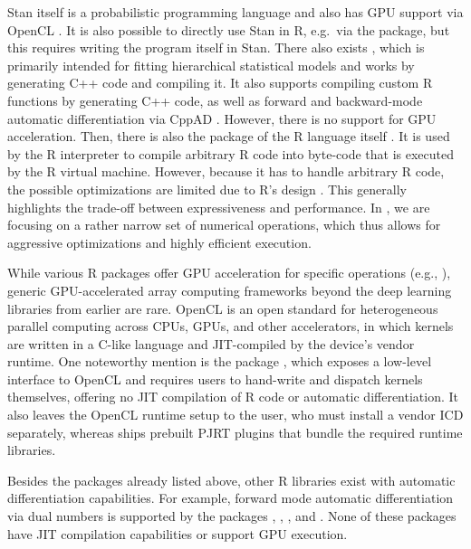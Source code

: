 Stan itself is a probabilistic programming language and also has GPU support via OpenCL \citep{ref-opencl}.
It is also possible to directly use Stan in R, e.g.~via the  package, but this requires writing the program itself in Stan.
There also exists , which is primarily intended for fitting hierarchical statistical models and works by generating C++ code and compiling it.
It also supports compiling custom R functions by generating C++ code, as well as forward and backward-mode automatic differentiation via CppAD \citep{ref-cppad}.
However, there is no support for GPU acceleration.
Then, there is also the  package of the R language itself \citep{ref-r}.
It is used by the R interpreter to compile arbitrary R code into byte-code that is executed by the R virtual machine.
However, because it has to handle arbitrary R code, the possible optimizations are limited due to R's design \citep{ref-evaluating-r}.
This generally highlights the trade-off between expressiveness and performance.
In , we are focusing on a rather narrow set of numerical operations, which thus allows for aggressive optimizations and highly efficient execution.

While various R packages offer GPU acceleration for specific operations (e.g., ), generic GPU-accelerated array computing frameworks beyond the deep learning libraries from earlier are rare.
OpenCL is an open standard for heterogeneous parallel computing across CPUs, GPUs, and other accelerators, in which kernels are written in a C-like language and JIT-compiled by the device's vendor runtime.
One noteworthy mention is the  package \citep{ref-r-opencl}, which exposes a low-level interface to OpenCL and requires users to hand-write and dispatch kernels themselves, offering no JIT compilation of R code or automatic differentiation.
It also leaves the OpenCL runtime setup to the user, who must install a vendor ICD separately, whereas  ships prebuilt PJRT plugins that bundle the required runtime libraries.

Besides the packages already listed above, other R libraries exist with automatic differentiation capabilities.
For example, forward mode automatic differentiation via dual numbers is supported by the packages , , , and  \citep[\citet{ref-salad}, \citet{ref-dual}, \citet{ref-madness}]{ref-nabla}.
None of these packages have JIT compilation capabilities or support GPU execution.

